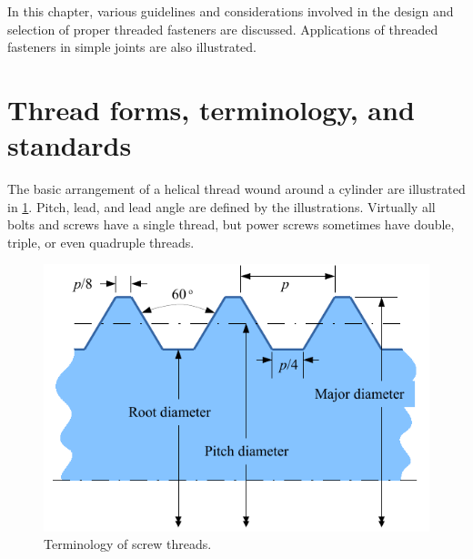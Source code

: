\documentclass[
10pt,
a4paper,
openany,
svgnames,
]{book}
\begin{document}
In this chapter, various guidelines and considerations involved in the design and selection of proper threaded fasteners are discussed. Applications of threaded fasteners in simple joints are also illustrated.

\section{Thread forms, terminology, and standards}

The basic arrangement of a helical thread wound around a cylinder are illustrated in \cref{fig: bolt terms}. Pitch, lead, and lead angle are defined by the illustrations. Virtually all bolts and screws have a single thread, but power screws sometimes have double, triple, or even quadruple threads.

\begin{figure}[h]
  \centering
  \includegraphics[scale=1.1]{pictures/Bolt/bolt-terminology}
  \caption{Terminology of screw threads.}
  \label{fig: bolt terms}
\end{figure}
\end{document}
